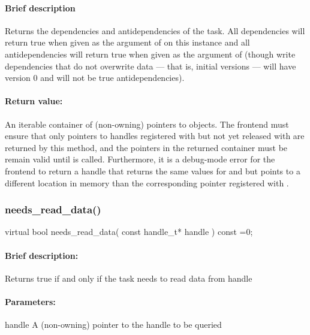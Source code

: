 \paragraph{Brief description} Returns the dependencies and antidependencies of the task.
       All dependencies will return true when given as the argument of 
       on this instance and all antidependencies will return true when given as the argument of
        (though write dependencies that do not overwrite data --- that is,
       initial versions --- will have version 0 and will not be true antidependencies).
     
\paragraph{Return value:} An iterable container of (non-owning) pointers to  objects.  The
       frontend must ensure that only pointers to handles registered with 
       but not yet released with  are returned by this method, and the
       pointers in the returned container must be remain valid until 
       is called.  Furthermore, it is a debug-mode error for the frontend to return a handle that
       returns the same values for  and  but points to a different location
       in memory than the corresponding pointer registered with .


\subsubsection{needs\_read\_data()}
\begin{CppCode}
    virtual bool
    needs_read_data(
      const handle_t* handle
    ) const =0;
\end{CppCode}

\paragraph{Brief description:} Returns true if and only if the task needs to read data from handle
     
\paragraph{Parameters:} 
\begin{compactdesc}
\item[handle] A (non-owning) pointer to the handle to be queried
\end{compactdesc}

